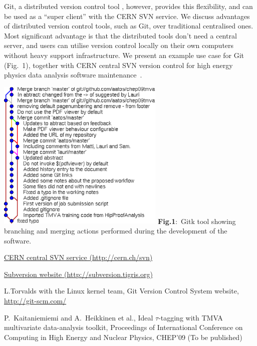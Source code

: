\documentclass[12pt]{article}
\begin{document}
\begin{minipage}{6cm}
Git, a distributed version control tool \cite{torvalds}, however, 
provides this flexibility, 
and can be used as a ``super client'' with the CERN SVN service.
We discuss advantages of distributed version control tools,
such as Git, over traditional centralised ones. 
Most significant advantage is that the distributed
tools don't need a central server, and users can utilise
version control locally on their own computers without
heavy support infrastructure.
We present an example use case for Git (Fig.~1), 
together with CERN central SVN version control for high energy physics data
analysis software maintenance~\cite{pk09aProceedings}.

\end{minipage}
 \hfill
 \begin{minipage}{8cm}
\includegraphics[width=8cm]{gitk.eps} 
{\bf Fig.1}:~Gitk tool showing branching and merging actions
performed during the development of the software.
\end{minipage}


\begin{thebibliography}{9}
\href{http://cern.ch/svn}{CERN central SVN service (http://cern.ch/svn)}

\href{http://subversion.tigris.org}{Subversion website (http://subversion.tigris.org)}

L.Torvalds with the Linux kernel team,
Git Version Control System website,
\href{http://git-scm.com/}{http://git-scm.com/}


P.~Kaitaniemiemi and A.~Heikkinen et al.,
Ideal $\tau$-tagging with TMVA multivariate data-analysis toolkit,
Proceedings of International Conference on 
Computing in High Energy and Nuclear Physics, CHEP'09
(To be published)

\end{thebibliography}
\end{document}
